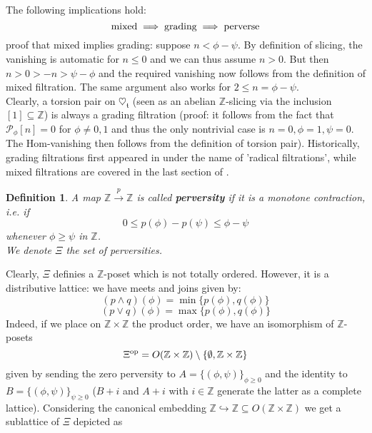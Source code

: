 \documentclass{article}
\newtheorem{defn}[thm]{Definition}
\theoremstyle{definition}
\begin{document}
The following implications hold: 
$$\textnormal{mixed} \implies \textnormal{grading} \implies \textnormal{perverse} $$
{\color{red}proof that mixed implies grading: suppose $n< \phi - \psi$. By definition of slicing, the vanishing is automatic for $n \le 0$ and we can thus assume $n>0$. But then $n>0>-n>\psi-\phi$ and the required vanishing now follows from the definition of mixed filtration. The same argument also works for $2 \le n = \phi - \psi$}. \\
Clearly, a torsion pair on $\heartsuit_{\mathfrak{t}}$ (seen as an abelian $\mathbb{Z}$-slicing via the inclusion $[1] \subseteq \mathbb{Z}$) is always a grading filtration {\color{red}(proof: it follows from the fact that $\mathscr{P}_{\phi}[n]=0$ for $\phi \not = 0,1$ and thus the only nontrivial case is $n=0, \phi=1, \psi=0$. The Hom-vanishing then follows from the definition of torsion pair)}. Historically, grading filtrations first appeared in \cite{ekh} under the name of 'radical filtrations', while mixed filtrations are covered in the last section of \cite{kos}.

\begin{defn}
A map $\mathbb{Z} \overset{p}{\longrightarrow} \mathbb{Z}$ is called \textbf{perversity} if it is a monotone contraction, i.e. if $$0 \le p(\phi) - p(\psi) \le \phi - \psi$$ 
whenever $\phi \ge \psi$  in $\mathbb{Z}$. \\
We denote $\Xi$ the set of perversities. 
\end{defn}

Clearly, $\Xi$ definies a $\mathbb{Z}$-poset which is not totally ordered. However, it is a distributive lattice: we have meets and joins given by: $$(p\land q)(\phi)=\min\{p(\phi), q(\phi) \}$$ $$(p\lor q)(\phi)=\max\{p(\phi), q(\phi) \}$$
Indeed, if we place on $\mathbb{Z}\times \mathbb{Z}$ the product order, we have an isomorphism of $\mathbb{Z}$-posets $$\Xi^{\textnormal{op}}=O(\mathbb{Z}\times \mathbb{Z})\setminus \{ \emptyset, \mathbb{Z} \times \mathbb{Z} \} $$
given by sending the zero perversity to $A=\{ (\phi,\psi) \}_{\phi \ge 0} $ and the identity to $B=\{ (\phi,\psi) \}_{\psi \ge 0}$ ($B+i$ and $A+i$ with $i \in \mathbb{Z}$ generate the latter as a complete lattice). Considering the canonical embedding $\mathbb{Z} \hookrightarrow \mathbb{Z}  \subseteq O(\mathbb{Z} \times \mathbb{Z})$ we get a sublattice of $\Xi$ depicted as 
\end{document}

